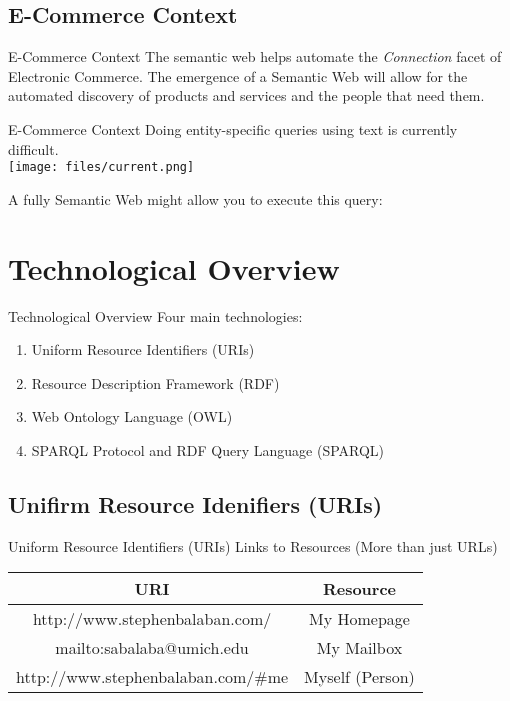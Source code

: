 \documentclass{beamer}
\begin{document}
\subsection[E-Commerce]{E-Commerce Context}
\begin{frame}{E-Commerce Context}
The semantic web helps automate the \textit{Connection} facet of Electronic Commerce.  The emergence of a Semantic Web will allow for the automated discovery of products and services and the people that need them.
\end{frame}

\begin{frame}{E-Commerce Context}
Doing entity-specific queries using text is currently difficult.\\
\texttt{[image: files/current.png]}
\pause

A fully Semantic Web might allow you to execute this query:\\

\vspace{0.25cm}

\end{frame}

\section{Technological Overview}
\begin{frame}{Technological Overview}
Four main technologies:

\begin{enumerate}
  \item Uniform Resource Identifiers (URIs)
  \item Resource Description Framework (RDF)
  \item Web Ontology Language (OWL)
  \item SPARQL Protocol and RDF Query Language (SPARQL)
\end{enumerate}

\end{frame}

\subsection[URIs]{Unifirm Resource Idenifiers (URIs)}
\begin{frame}{Uniform Resource Identifiers (URIs)}
Links to Resources (More than just URLs)\\
\vspace{1cm}
\begin{tabular}{| c | c |}
\hline
\textbf{URI} & \textbf{Resource}\\
\hline
http://www.stephenbalaban.com/ & My Homepage \\
\hline
mailto:sabalaba@umich.edu  & My Mailbox\\
\hline
http://www.stephenbalaban.com/\#me & Myself (Person)\\
\hline
\end{tabular}
\end{frame}
\end{document}

